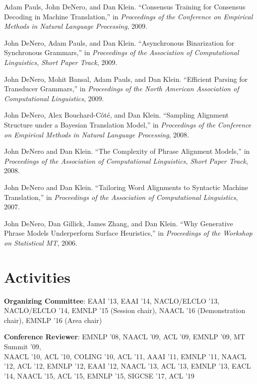 \documentclass[margin,line]{res}
\begin{document}
\begin{resume}
Adam Pauls, John DeNero, and Dan Klein. ``Consensus Training for Consensus Decoding in Machine Translation,'' in {\it Proceedings of the Conference on Empirical Methods in Natural Language Processing}, 2009.

John DeNero, Adam Pauls, and Dan Klein. ``Asynchronous Binarization for Synchronous Grammars,'' in {\it Proceedings of the Association of Computational Linguistics, Short Paper Track}, 2009.

John DeNero, Mohit Bansal, Adam Pauls, and Dan Klein. ``Efficient Parsing for Transducer Grammars,'' in {\it Proceedings of the North American Association of Computational Linguistics}, 2009.

John DeNero, Alex Bouchard-Côté, and Dan Klein. ``Sampling Alignment Structure under a Bayesian Translation Model,'' in {\it Proceedings of the Conference on Empirical Methods in Natural Language Processing}, 2008.

John DeNero and Dan Klein. ``The Complexity of Phrase Alignment Models,'' in {\it Proceedings of the Association of Computational Linguistics, Short Paper Track}, 2008.

John DeNero and Dan Klein. ``Tailoring Word Alignments to Syntactic Machine Translation,'' in {\it Proceedings of the Association of Computational Linguistics}, 2007.

John DeNero, Dan Gillick, James Zhang, and Dan Klein. ``Why Generative Phrase Models Underperform Surface Heuristics,'' in {\it Proceedings of the Workshop on Statistical MT}, 2006.

\section{\sc Activities}

{\bf Organizing Committee}: EAAI '13, EAAI '14, NACLO/ELCLO '13, NACLO/ELCLO '14,
EMNLP '15 (Session chair), NAACL '16 (Demonstration chair), EMNLP '16 (Area chair)

{\bf Conference Reviewer}: EMNLP '08, NAACL '09, ACL '09, EMNLP '09, MT Summit
'09,\\ NAACL '10, ACL '10, COLING '10, ACL '11, AAAI '11, EMNLP '11, NAACL '12,
ACL '12, EMNLP '12, EAAI '12, NAACL '13, ACL '13, EMNLP '13, EACL '14,
NAACL '15, ACL '15, EMNLP '15, SIGCSE '17, ACL '19

\end{resume}
\end{document}
